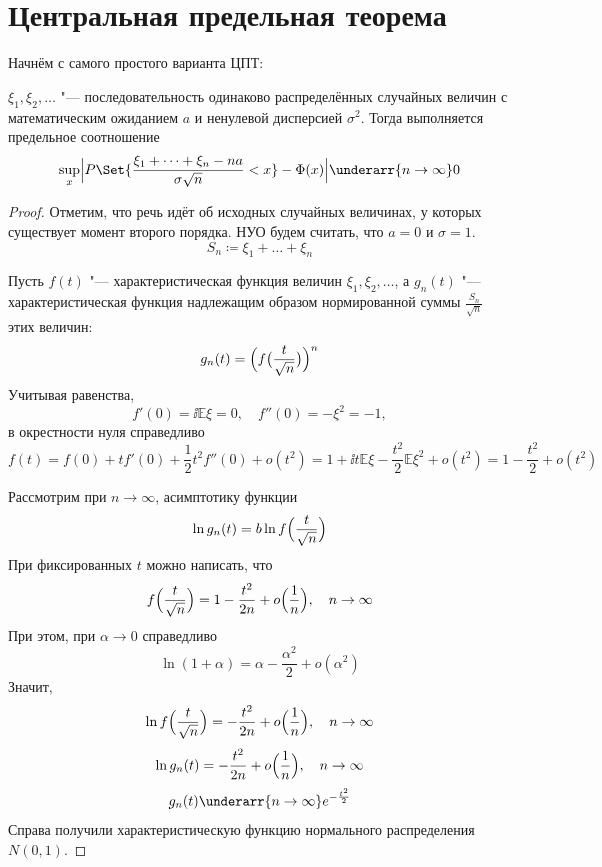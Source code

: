 \section{Центральная предельная теорема}

Начнём с самого простого варианта ЦПТ:
\begin{theorem}[Леви]
    $ \xi_1, \xi_2, \dotsc $ "--- последовательность одинаково распределённых случайных величин с
    математическим ожиданием $ a $ и ненулевой дисперсией $ \sigma^2 $.
    Тогда выполняется предельное соотношение
    $$ \sup\limits_x \Bigl| P \Set{\frac{\xi_1 + \dots + \xi_n - na}{\sigma \sqrt n} < x} -
    \Phi(x) \Bigr| \underarr{n \to \infty} 0 $$
\end{theorem}

\begin{proof}
    Отметим, что речь идёт об исходных случайных величинах, у которых существует момент второго
    порядка.
    НУО будем считать, что $ a = 0 $ и $ \sigma = 1 $.
    $$ S_n \coloneq \xi_1 + \dots + \xi_n $$

    Пусть $ f(t) $ "--- характеристическая функция величин $ \xi_1, \xi_2, \dotsc $, а
    $ g_n(t) $ "--- характеристическая функция надлежащим образом нормированной суммы
    $ \frac{S_n}{\sqrt n} $ этих величин:
    $$ g_n(t) = \Bigl( f \bigl( \frac{t}{\sqrt n} \bigr) \Bigr)^n $$
    Учитывая равенства,
    $$ f'(0) = \ii \mathbb E \xi = 0, \quad f''(0) = -\mathbb \xi^2 = -1, $$
    в окрестности нуля справедливо
    $$ f(t) = f(0) + tf'(0) + \frac12 t^2 f''(0) + o(t^2) = 1 + \ii t \mathbb E \xi - \frac{t^2}2
    \mathbb E \xi^2 + o(t^2) = 1 - \frac{t^2}2 + o(t^2) $$

    Рассмотрим при $ n \to \infty $, асимптотику функции
    $$ \ln g_n(t) = b \ln f \Bigl( \frac t {\sqrt n} \Bigr) $$
    При фиксированных $ t $ можно написать, что
    $$ f \Bigl( \frac{t}{\sqrt n} \Bigr) = 1 - \frac{t^2}{2n} + o \Bigl( \frac1n \Bigr), \quad
    n \to \infty $$
    При этом, при $ \alpha \to 0 $ справедливо
    $$ \ln(1 + \alpha) = \alpha - \frac{\alpha^2}2 + o(\alpha^2) $$
    Значит,
    $$ \ln f \Bigl( \frac{t}{\sqrt n} \Bigr) = -\frac{t^2}{2n} + o \Bigl( \frac1n \Bigr), \quad
    n \to \infty $$
    $$ \ln g_n(t) = -\frac{t^2}{2n} + o \Bigl( \frac1n \Bigr), \quad n \to \infty $$
    $$ g_n(t) \underarr{n \to \infty} e^{-\frac{t^2}2} $$
    Справа получили характеристическую функцию нормального распределения $ N(0, 1) $.
\end{proof}

